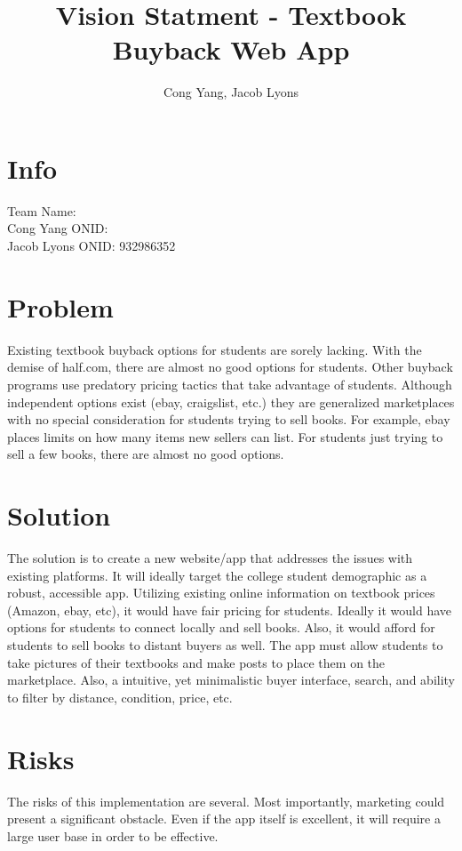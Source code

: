 \documentclass[12pt]{article}
\title{Vision Statment - Textbook Buyback Web App}
\author{Cong Yang, Jacob Lyons}
\begin{document}
	\maketitle

	\tableofcontents
                \section{Info}
		Team Name:      \\
		Cong Yang ONID: \\
		Jacob Lyons ONID: 932986352 \\


	\section{Problem}
	Existing textbook buyback options for students are sorely lacking. With the demise of half.com, 
	there are almost no good options for students. Other buyback programs use predatory pricing tactics 
	that take advantage of students. Although independent options exist (ebay, craigslist, etc.) they are
	generalized marketplaces with no special consideration for students trying to sell books. For example,
	ebay places limits on how many items new sellers can list. For students just trying to sell a few books,
	there are almost no good options.
		


	\section{Solution}

	The solution is to create a new website/app that addresses the issues with existing platforms.
	It will ideally target the college student demographic as a robust, accessible app. Utilizing existing online
        information on textbook prices (Amazon, ebay, etc), it would have fair pricing for students. Ideally it would have
	options for students to connect locally and sell books. Also, it would afford for students to sell books to distant buyers
	as well. The app must allow students to take pictures of their textbooks and make posts to place them on the marketplace.
	Also, a intuitive, yet minimalistic buyer interface, search, and ability to filter by distance, condition, price, etc.

		

	\section{Risks}
	The risks of this implementation are several. Most importantly, marketing could present a significant obstacle.
        Even if the app itself is excellent, it will require a large user base in order to be effective. 
\end{document}

